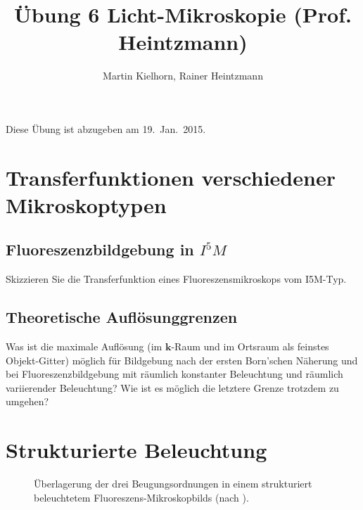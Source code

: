 \documentclass{article}
\begin{document}
\author{Martin Kielhorn, Rainer Heintzmann}
\title{\"Ubung 6 Licht-Mikroskopie (Prof. Heintzmann)}
\maketitle
\noindent Diese \"Ubung ist abzugeben am 19.~Jan.~2015.

\section{Transferfunktionen verschiedener Mikroskoptypen}
\subsection*{Fluoreszenzbildgebung in $I^5M$}
Skizzieren Sie die Transferfunktion eines Fluoreszensmikroskops vom I5M-Typ.

\subsection*{Theoretische Aufl\"osunggrenzen}

Was ist die maximale Aufl\"osung (im $\mathbf{k}$-Raum und im Ortsraum als feinstes Objekt-Gitter) m\"oglich f\"ur Bildgebung nach der ersten Born'schen Näherung und bei Fluoreszenzbildgebung mit räumlich konstanter Beleuchtung und räumlich variierender Beleuchtung? Wie ist es möglich die letztere Grenze trotzdem zu umgehen?


\section{Strukturierte Beleuchtung}

\begin{figure}[htbp]
  \centering
  
  \caption{\"Uberlagerung der drei Beugungsordnungen in einem
    strukturiert beleuchtetem Fluoreszens-Mikroskopbilds (nach \cite{heintzmann1999laterally}).}
  \label{fig:sim-mixing}
\end{figure}



\end{document}
